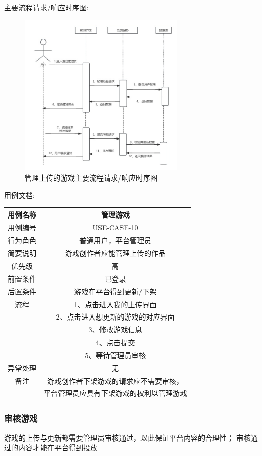 \documentclass[12pt]{ctexart} %
\begin{document}
主要流程请求/响应时序图:
\begin{figure}[ht]
  \centering
  \includegraphics[width=0.7\textwidth]{yongli10.jpg}
  \caption{管理上传的游戏主要流程请求/响应时序图}
\end{figure}
用例文档:

\begin{tabular}{|c|c|}
  \hline
  用例名称& 管理游戏\\
  \hline
  用例编号 & USE-CASE-10\\
  \hline
  行为角色 & 普通用户，平台管理员\\
  \hline
  简要说明 & 游戏创作者应能管理上传的作品\\
  \hline
  优先级 & 高\\
  \hline
  前置条件 & 已登录\\
  \hline
  后置条件 & 游戏在平台得到更新/下架\\
  \hline
  流程 & 1、点击进入我的上传界面\\
      &  2、点击进入想更新的游戏的对应界面\\
      &  3、修改游戏信息\\
      &  4、点击提交\\
      &  5、等待管理员审核\\
  \hline
  异常处理 & 无\\
  \hline
  备注 & 游戏创作者下架游戏的请求应不需要审核，\\
       & 平台管理员应具有下架游戏的权利以管理游戏\\
  \hline
\end{tabular}

\subsubsection{审核游戏}
游戏的上传与更新都需要管理员审核通过，以此保证平台内容的合理性；
审核通过的内容才能在平台得到投放
\end{document}
